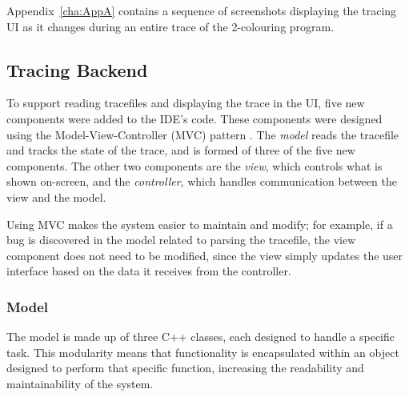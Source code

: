 \documentclass[authoryearcitations]{UoYCSproject}
\begin{document}
Appendix~\ref{cha:AppA} contains a sequence of screenshots displaying the tracing
UI as it changes during an entire trace of the 2-colouring program.

\subsection{Tracing Backend}
\label{sec:TracingBackend}

To support reading tracefiles and displaying the trace in the UI, five new
components were added to the IDE's code. These components were designed using the
Model-View-Controller (MVC) pattern \citep{mvc}. The \emph{model} reads the
tracefile and tracks the state of the trace, and is formed of three of the
five new components. The other two components are the \emph{view}, which
controls what is shown on-screen, and the \emph{controller}, which handles
communication between the view and the model.

Using MVC makes the system easier to maintain and modify; for example, if a bug
is discovered in the model related to parsing the tracefile, the view component
does not need to be modified, since the view simply updates the user interface
based on the data it receives from the controller.

\subsubsection{Model}
\label{sec:MVCModel}

The model is made up of three C++ classes, each designed to handle a specific task.
This modularity means that functionality is encapsulated within an object designed
to perform that specific function, increasing the readability and maintainability
of the system.
\end{document}
